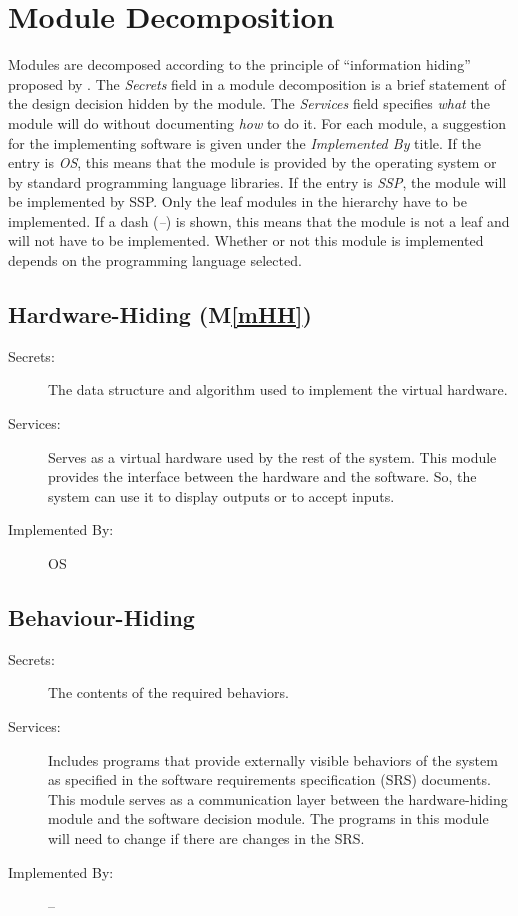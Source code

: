 \documentclass[12pt, titlepage]{article}
\newcommand{\progname}{SSP}
\newcommand{\mref}[1]{M\ref{#1}}
\begin{document}
\section{Module Decomposition} \label{SecMD}

\hspace{3ex}Modules are decomposed according to the principle of
``information hiding'' proposed by \citet{ParnasEtAl1984}. The
\emph{Secrets} field in a module decomposition is a brief statement of
the design decision hidden by the module. The \emph{Services} field
specifies \emph{what} the module will do without documenting
\emph{how} to do it. For each module, a suggestion for the
implementing software is given under the \emph{Implemented By}
title. If the entry is \emph{OS}, this means that the module is
provided by the operating system or by standard programming language
libraries. If the entry is \emph{\progname}, the module will be implemented by 
\progname. Only the leaf modules in the hierarchy have to be implemented. If a 
dash (\emph{--}) is shown, this means that the module is not a leaf and will 
not have to be implemented. Whether or not this module is implemented depends 
on the programming language selected.

\subsection{Hardware-Hiding (\mref{mHH})}

\begin{description}
\item[Secrets:]The data structure and algorithm used to implement the
  virtual hardware.
\item[Services:]Serves as a virtual hardware used by the rest of the
  system. This module provides the interface between the hardware and
  the software. So, the system can use it to display outputs or to
  accept inputs.
\item[Implemented By:] OS
\end{description}

\subsection{Behaviour-Hiding}

\begin{description}
\item[Secrets:]The contents of the required behaviors.
\item[Services:]Includes programs that provide externally visible
  behaviors of the system as specified in the software requirements
  specification (SRS) documents. This module serves as a communication
  layer between the hardware-hiding module and the software decision
  module. The programs in this module will need to change if there are
  changes in the SRS.
\item[Implemented By:] --
\end{description}
\end{document}
